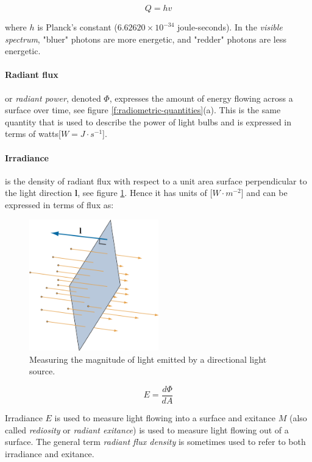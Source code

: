 \begin{equation}
	Q=hv
\end{equation}

where $h$ is Planck's constant ($6.62620\times 10^{-34}$ joule-seconds). In the \textit{visible spectrum}, "bluer" photons are more energetic, and "redder" photons are less energetic.

\paragraph{\textbf{Radiant flux}} or \textit{radiant power}, denoted $\Phi$, expresses the amount of energy flowing across a surface over time, see figure \ref{f:radiometric-quantities}(a). This is the same quantity that is used to describe the power of light bulbs and is expressed in terms of watts[$W=J\cdot s^{-1}$].

\paragraph{\textbf{Irradiance}} is the density of radiant flux with respect to a unit area surface perpendicular to the light direction $\mathbf{l}$, see figure \ref{f:irradiance-measure}. Hence it has units of [$W\cdot m^{-2}$] and can be expressed in terms of flux as: 

\begin{figure}
\sidecaption
	\includegraphics[width=0.5\textwidth]{graphics/gi/irradiance}
	\caption{Measuring the magnitude of light emitted by a directional light source.}
	\label{f:irradiance-measure}
\end{figure}

\begin{equation}
	E=\frac{d\Phi}{dA}
\end{equation}

Irradiance $E$ is used to measure light flowing into a surface and exitance $M$ (also called \textit{rediosity} or \textit{radiant exitance}) is used to measure light flowing out of a surface. The general term \textit{radiant flux density} is sometimes used to refer to both irradiance and exitance.

